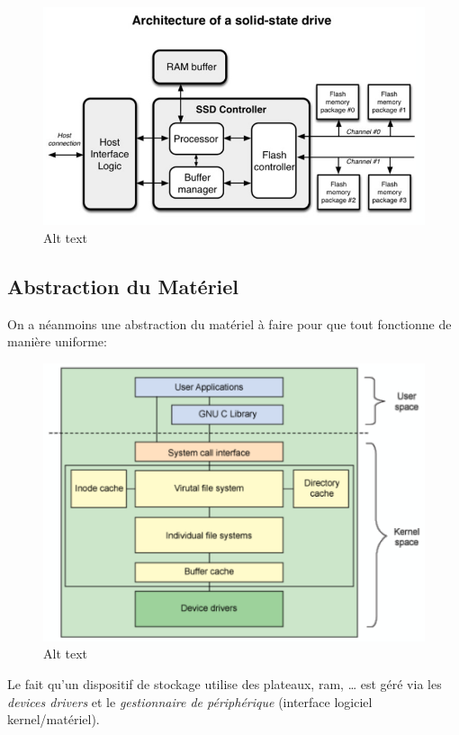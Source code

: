 \begin{figure}
\centering
\includegraphics{image-36.png}
\caption{Alt text}
\end{figure}

\subsection{Abstraction du Matériel}\label{abstraction-du-matuxe9riel}

On a néanmoins une abstraction du matériel à faire pour que tout
fonctionne de manière uniforme:

\begin{figure}
\centering
\includegraphics{image-37.png}
\caption{Alt text}
\end{figure}

Le fait qu'un dispositif de stockage utilise des plateaux, ram, \ldots{}
est géré via les \emph{devices drivers} et le \emph{gestionnaire de
périphérique} (interface logiciel kernel/matériel).

